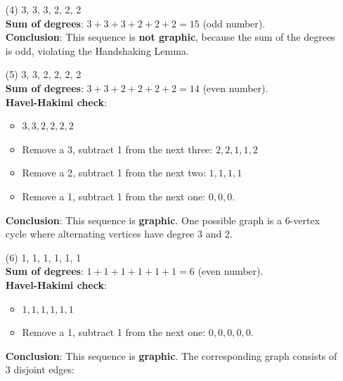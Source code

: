 \documentclass[12pt]{article}
\begin{document}
\begin{itemize}
\begin{itemize}
    \item[(4)]  {3, 3, 3, 2, 2, 2} \\
    \textbf{Sum of degrees}: \( 3 + 3 + 3 + 2 + 2 + 2 = 15 \) (odd number). \\ 
    \textbf{Conclusion}: This sequence is \textbf{not graphic}, because the sum of the degrees is odd, violating the Handshaking Lemma.
    \item[(5)]  {3, 3, 2, 2, 2, 2} \\
    \textbf{Sum of degrees}: \( 3 + 3 + 2 + 2 + 2 + 2 = 14 \) (even number).\\
    \textbf{Havel-Hakimi check}:
    \begin{itemize}
        \item \( 3, 3, 2, 2, 2, 2 \)
        \item Remove a 3, subtract 1 from the next three: \( 2, 2, 1, 1, 2 \)
        \item Remove a 2, subtract 1 from the next two: \( 1, 1, 1, 1 \)
        \item Remove a 1, subtract 1 from the next one: \( 0, 0, 0 \).
    \end{itemize}
    \textbf{Conclusion}: This sequence is \textbf{graphic}. One possible graph is a 6-vertex cycle where alternating vertices have degree 3 and 2. \\
    \item[(6)]  {1, 1, 1, 1, 1, 1} \\
    \textbf{Sum of degrees}: \( 1 + 1 + 1 + 1 + 1 + 1 = 6 \) (even number). \\
    \textbf{Havel-Hakimi check}:
    \begin{itemize}
        \item \( 1, 1, 1, 1, 1, 1 \)
        \item Remove a 1, subtract 1 from the next one: \( 0, 0, 0, 0, 0 \).
    \end{itemize}
    \textbf{Conclusion}: This sequence is \textbf{graphic}. The corresponding graph consists of 3 disjoint edges: \\    
\end{itemize}
\end{itemize}
\end{document}
